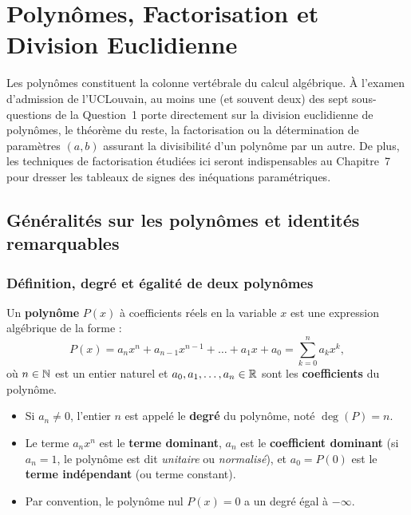 \chapter{Polynômes, Factorisation et Division Euclidienne}

Les polynômes constituent la colonne vertébrale du calcul algébrique. À l'examen d'admission de l'UCLouvain, au moins une (et souvent deux) des sept sous-questions de la Question~1 porte directement sur la division euclidienne de polynômes, le théorème du reste, la factorisation ou la détermination de paramètres $(a,b)$ assurant la divisibilité d'un polynôme par un autre. De plus, les techniques de factorisation étudiées ici seront indispensables au Chapitre~7 pour dresser les tableaux de signes des inéquations paramétriques.

\section{Généralités sur les polynômes et identités remarquables}

\subsection{Définition, degré et égalité de deux polynômes}

\begin{definition}
Un \textbf{polynôme} $P(x)$ à coefficients réels en la variable $x$ est une expression algébrique de la forme :
\[
    P(x) = a_n x^n + a_{n-1} x^{n-1} + \dots + a_1 x + a_0 = \sum_{k=0}^n a_k x^k,
\]
où $n \in \mathbb{N}$ est un entier naturel et $a_0, a_1, \dots, a_n \in \mathbb{R}$ sont les \textbf{coefficients} du polynôme.
\begin{itemize}
    \item Si $a_n \neq 0$, l'entier $n$ est appelé le \textbf{degré} du polynôme, noté $\deg(P) = n$.
    \item Le terme $a_n x^n$ est le \textbf{terme dominant}, $a_n$ est le \textbf{coefficient dominant} (si $a_n = 1$, le polynôme est dit \emph{unitaire} ou \emph{normalisé}), et $a_0 = P(0)$ est le \textbf{terme indépendant} (ou terme constant).
    \item Par convention, le polynôme nul $P(x) = 0$ a un degré égal à $-\infty$.
\end{itemize}
\end{definition}

